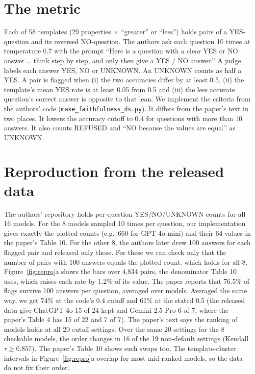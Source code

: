 \documentclass[10pt]{article}
\begin{document}
\section{The metric}
Each of 58 templates (29 properties $\times$ ``greater'' or ``less'') holds pairs of a YES-question and its reversed NO-question. The authors ask each question 10 times at temperature 0.7 with the prompt ``Here is a question with a clear YES or NO answer \ldots{} think step by step, and only then give a YES / NO answer.'' A judge labels each answer YES, NO or UNKNOWN. An UNKNOWN counts as half a YES. A pair is flagged when (i) the two accuracies differ by at least 0.5, (ii) the template's mean YES rate is at least 0.05 from 0.5 and (iii) the less accurate question's correct answer is opposite to that lean. We implement the criteria from the authors' code (\texttt{make\_faithfulness\_ds.py}). It differs from the paper's text in two places. It lowers the accuracy cutoff to 0.4 for questions with more than 10 answers. It also counts REFUSED and ``NO because the values are equal'' as UNKNOWN.

\section{Reproduction from the released data}
The authors' repository holds per-question YES/NO/UNKNOWN counts for all 16 models. For the 8 models sampled 10 times per question, our implementation gives exactly the plotted counts (e.g.\ 660 for GPT-4o-mini) and their 64 values in the paper's Table 10. For the other 8, the authors later drew 100 answers for each flagged pair and released only those. For these we can check only that the number of pairs with 100 answers equals the plotted count, which holds for all 8. Figure~\ref{fig:repro}a shows the bars over 4,834 pairs, the denominator Table 10 uses, which raises each rate by 1.2\% of its value. The paper reports that 76.5\% of flags survive 100 answers per question, averaged over models. Averaged the same way, we get 74\% at the code's 0.4 cutoff and 61\% at the stated 0.5 (the released data give ChatGPT-4o 15 of 24 kept and Gemini 2.5 Pro 6 of 7, where the paper's Table 4 has 15 of 22 and 7 of 7). The paper's text says the ranking of models holds at all 20 cutoff settings. Over the same 20 settings for the 8 checkable models, the order changes in 16 of the 19 non-default settings (Kendall $\tau \geq 0.857$). The paper's Table 10 shows such swaps too. The template-cluster intervals in Figure~\ref{fig:repro}a overlap for most mid-ranked models, so the data do not fix their order.
\end{document}

